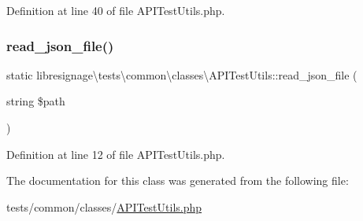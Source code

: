 Definition at line 40 of file A\+P\+I\+Test\+Utils.\+php.

\mbox{\label{classlibresignage_1_1tests_1_1common_1_1classes_1_1APITestUtils_a59f4fce18c6b89f92f3be56ddc7ddb06}} 
\subsubsection{\texorpdfstring{read\+\_\+json\+\_\+file()}{read\_json\_file()}}
{\footnotesize\ttfamily static libresignage\textbackslash{}tests\textbackslash{}common\textbackslash{}classes\textbackslash{}\+A\+P\+I\+Test\+Utils\+::read\+\_\+json\+\_\+file (\begin{DoxyParamCaption}\item[{string}]{\$path }\end{DoxyParamCaption})\hspace{0.3cm}{\ttfamily [static]}}



Definition at line 12 of file A\+P\+I\+Test\+Utils.\+php.



The documentation for this class was generated from the following file\+:\begin{DoxyCompactItemize}
\item 
tests/common/classes/\hyperlink{APITestUtils_8php}{A\+P\+I\+Test\+Utils.\+php}\end{DoxyCompactItemize}
